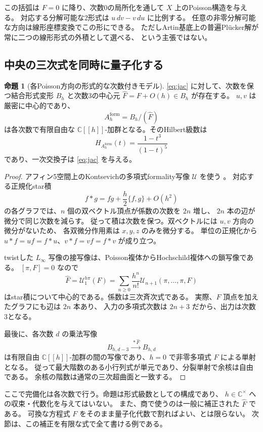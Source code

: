 \documentclass[a4paper,11pt]{ltjsarticle}
\theoremstyle{definition}
\newtheorem{theorem}{命題}[section]
\newcommand{\CC}{\mathbb C}
\begin{document}
この括弧は $F=0$ に降り、次数0の局所化を通して $X$ 上のPoisson構造を与える。
対応する分解可能な2形式は $u\,dv-v\,du$ に比例する。
任意の非零分解可能な方向は線形座標変換でこの形にできる。
ただしArtin基底上の普遍Plücker解が常に二つの線形形式の外積として選べる、
という主張ではない。

\subsection{中央の三次式を同時に量子化する}

\begin{theorem}[各Poisson方向の形式的な次数付きモデル]\label{thm:formalgraded}
\eqref{eq:jac} に対して、次数を保つ結合形式変形 $B_h$ と次数3の中心元
$\widehat F=F+O(h)\in B_h$ が存在する。
$u,v$ は厳密に中心的であり、
\[
 A_h^{\mathrm{form}}=B_h/(\widehat F)
\]
は各次数で有限自由な $\CC[[h]]$-加群となる。そのHilbert級数は
\[
 H_{A_h^{\mathrm{form}}}(t)=\frac{1-t^3}{(1-t)^5}
\]
であり、一次交換子は \eqref{eq:jac} を与える。
\end{theorem}

\begin{proof}
アフィン5空間上のKontsevichの多項式formality写像 $\mathcal U$ を使う
\cite[Sections 4.6, 6, 8]{Kon}。
対応する正規化star積
\[
 f*g=fg+\frac h2\{f,g\}+O(h^2)
\]
の各グラフでは、$n$ 個の双ベクトル頂点が係数の次数を $2n$ 増し、
$2n$ 本の辺が微分で同じ次数を減らす。
従って積は次数を保つ。双ベクトルには $u,v$ 方向の微分がないため、
各双微分作用素は $x,y,z$ のみを微分する。
単位の正規化から $u*f=uf=f*u$、$v*f=vf=f*v$ が成り立つ。

twistした $L_\infty$ 写像の接写像は、Poisson複体からHochschild複体への鎖写像である。
$[\pi,F]=0$ なので
\[
 \widehat F=\mathcal U^{h\pi}_1(F)
 =\sum_{n\ge0}\frac{h^n}{n!}\mathcal U_{n+1}(\pi,\ldots,\pi,F)
\]
はstar積について中心的である。係数は三次斉次式である。
実際、$F$ 頂点を加えたグラフにも辺は $2n$ 本あり、
入力の多項式次数は $2n+3$ だから、出力は次数3となる。

最後に、各次数 $d$ の乗法写像
\[
 B_{h,d-3}\xrightarrow{\ *\widehat F\ }B_{h,d}
\]
は有限自由 $\CC[[h]]$-加群の間の写像であり、$h=0$ で非零多項式 $F$ による単射となる。
従って最大階数のある小行列式が単元であり、分裂単射で余核は自由である。
余核の階数は通常の三次超曲面と一致する。
\end{proof}

ここで完備化は各次数で行う。命題は形式級数としての構成であり、
$h\in\CC^\times$ への収束・代数化を与えてはいない。
また、商で使うのは一般に補正された $\widehat F$ である。
可換な方程式 $F$ をそのまま量子化代数で割ればよい、とは限らない。
次節は、この補正を有限な式で全て書ける例である。
\end{document}
